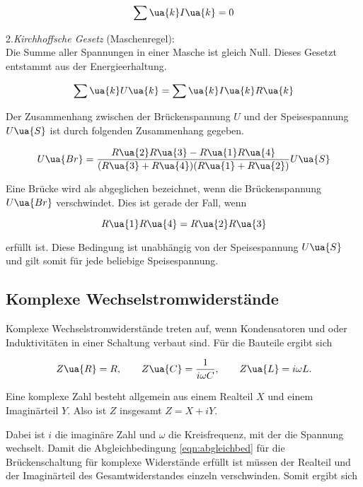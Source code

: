 \begin{equation}
  \label{eqn:Kirchhoff1}
  \sum\ua{k} I\ua{k} = 0
\end{equation}

2.\emph{Kirchhoffsche Gesetz} (Maschenregel):\\
Die Summe aller Spannungen in einer Masche ist gleich Null.
Dieses Gesetzt entstammt aus der Energieerhaltung.

\begin{equation}
  \label{eqn:Krichhoff2}
  \sum\ua{k}U\ua{k} = \sum\ua{k}I\ua{k}R\ua{k}
\end{equation}

Der Zusammenhang zwischen der Brückenspannung $U$ und der Speisespannung $U\ua{S}$
ist durch folgenden Zusammenhang gegeben.

\begin{equation}
  \label{eqn:BrückenUndSpeisespannung}
  U\ua{Br} = \frac{R\ua{2}R\ua{3} - R\ua{1}R\ua{4}}{(R\ua{3} + R\ua{4})(R\ua{1} + R\ua{2})}U\ua{S}
\end{equation}

Eine Brücke wird als abgeglichen bezeichnet, wenn die Brückenspannung $U\ua{Br}$ verschwindet.
Dies ist gerade der Fall, wenn

\begin{equation}
  \label{eqn:abgleichbed}
  R\ua{1}R\ua{4} = R\ua{2}R\ua{3}
\end{equation}

erfüllt ist.
Diese Bedingung ist unabhängig von der Speisespannung $U\ua{S}$
und gilt somit für jede beliebige Speisespannung.

\subsection{Komplexe Wechselstromwiderstände}

Komplexe Wechselstromwiderstände treten auf, wenn Kondensatoren und oder Induktivitäten
in einer Schaltung verbaut sind. Für die Bauteile ergibt sich

\begin{equation*}
  Z\ua{R} = R, \qquad Z\ua{C} = \frac{1}{i\omega C}, \qquad Z\ua{L} = i\omega L.
\end{equation*}

Eine komplexe Zahl besteht allgemein aus einem Realteil $X$ und einem Imaginärteil
$Y$. Also ist $Z$ insgesamt $Z = X + iY$.

Dabei ist $i$ die imaginäre Zahl und $\omega$ die Kreisfrequenz, mit der die
Spannung wechselt. Damit die Abgleichbedingung \eqref{eqn:abgleichbed} für die
Brückenschaltung für komplexe Widerstände erfüllt ist müssen der Realteil und der
Imaginärteil des Gesamtwiderstandes einzeln verschwinden. Somit ergibt sich

